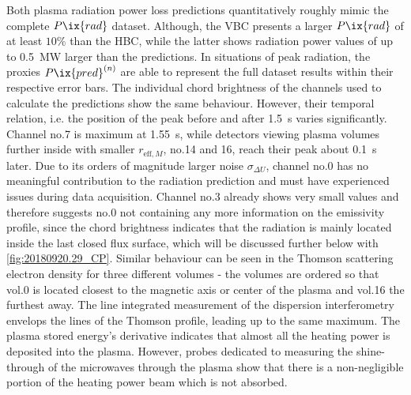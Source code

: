             Both plasma radiation power loss predictions quantitatively roughly mimic the complete $P\ix{rad}$ dataset. Although, the VBC presents a larger $P\ix{rad}$ of at least $10\%$ than the HBC, while the latter shows radiation power values of up to \SI{0.5}{\mega\watt} larger than the predictions. In situations of peak radiation, the proxies $P\ix{pred}^{\left(n\right)}$ are able to represent the full dataset results within their respective error bars. The individual chord brightness of the channels used to calculate the predictions show the same behaviour. However, their temporal relation, i.e. the position of the peak before and after \SI{1.5}{\second} varies significantly. Channel no.7 is maximum at \SI{1.55}{\second}, while detectors viewing plasma volumes further inside with smaller $r_{\text{eff}, M}$, no.14 and 16, reach their peak about \SI{0.1}{\second} later. Due to its orders of magnitude larger noise $\sigma_{\Delta U}$, channel no.0 has no meaningful contribution to the radiation prediction and must have experienced issues during data acquisition. Channel no.3 already shows very small values and therefore suggests no.0 not containing any more information on the emissivity profile, since the chord brightness indicates that the radiation is mainly located inside the last closed flux surface, which will be discussed further below with \cref{fig:20180920.29_CP}. Similar behaviour can be seen in the Thomson scattering electron density for three different volumes - the volumes are ordered so that vol.0 is located closest to the magnetic axis or center of the plasma and vol.16 the furthest away. The line integrated measurement of the dispersion interferometry envelops the lines of the Thomson profile, leading up to the same maximum. The plasma stored energy's derivative indicates that almost all the heating power is deposited into the plasma. However, probes dedicated to measuring the shine-through of the microwaves through the plasma show that there is a non-negligible portion of the heating power beam which is not absorbed.\\%
